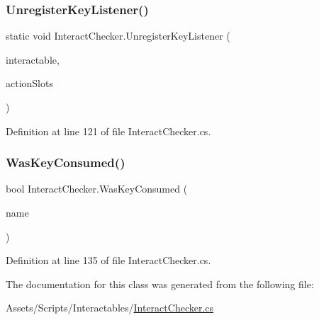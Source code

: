 \subsubsection{\texorpdfstring{Unregister\+Key\+Listener()}{UnregisterKeyListener()}}
{\footnotesize\ttfamily static void Interact\+Checker.\+Unregister\+Key\+Listener (\begin{DoxyParamCaption}\item[{\mbox{\hyperlink{interface_i_interactable}{I\+Interactable}}}]{interactable,  }\item[{List$<$ string $>$}]{action\+Slots }\end{DoxyParamCaption})\hspace{0.3cm}{\ttfamily [static]}}



Definition at line 121 of file Interact\+Checker.\+cs.

\mbox{\label{class_interact_checker_a00e90252be48f811666cc6805a3ca5fa}} 
\subsubsection{\texorpdfstring{Was\+Key\+Consumed()}{WasKeyConsumed()}}
{\footnotesize\ttfamily bool Interact\+Checker.\+Was\+Key\+Consumed (\begin{DoxyParamCaption}\item[{string}]{name }\end{DoxyParamCaption})}



Definition at line 135 of file Interact\+Checker.\+cs.



The documentation for this class was generated from the following file\+:\begin{DoxyCompactItemize}
\item 
Assets/\+Scripts/\+Interactables/\mbox{\hyperlink{_interact_checker_8cs}{Interact\+Checker.\+cs}}\end{DoxyCompactItemize}
